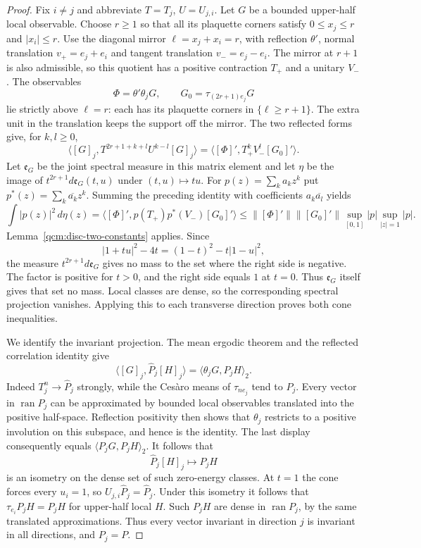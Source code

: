 \documentclass[11pt,letterpaper,reqno]{amsart}
\theoremstyle{definition}
\begin{document}
\begin{proof}
Fix $i\ne j$ and abbreviate $T=T_j$, $U=U_{j,i}$. Let $G$ be a
bounded upper-half local observable. Choose $r\ge1$ so that all its
plaquette corners satisfy $0\le x_j\le r$ and $|x_i|\le r$.
Use the diagonal mirror $\ell=x_j+x_i=r$, with reflection $\theta'$,
normal translation $v_+=e_j+e_i$ and tangent translation
$v_-=e_j-e_i$. The mirror at $r+1$ is also admissible, so this
quotient has a positive contraction $T_+$ and a unitary $V_-$.
The observables
\[
 \Phi=\theta'\theta_jG,\qquad G_0=\tau_{(2r+1)e_j}G
\]
lie strictly above $\ell=r$: each has its plaquette corners in
$\{\ell\ge r+1\}$. The extra unit in the translation keeps the
support off the mirror. The two reflected forms give, for $k,l\ge0$,
\[
 \langle[G]_j,T^{2r+1+k+l}U^{k-l}[G]_j\rangle
    =\langle[\Phi]',T_+^kV_-^l[G_0]'\rangle.
\]
Let $\mathfrak e_G$ be the joint spectral measure in this matrix
element and let $\eta$ be the image of
$t^{2r+1}d\mathfrak e_G(t,u)$ under $(t,u)\mapsto tu$.
For $p(z)=\sum_k a_kz^k$ put
$p^*(z)=\sum_k\overline{a_k}z^k$. Summing the preceding identity
with coefficients $a_k\overline{a_l}$ yields
\[
 \int|p(z)|^2\,d\eta(z)
  =\langle[\Phi]',p(T_+)p^*(V_-)[G_0]'\rangle
  \le\|[\Phi]'\|\|[G_0]'\|
       \sup_{[0,1]}|p|\sup_{|z|=1}|p|.
\]
Lemma~\ref{qcm:disc-two-constants} applies. Since
\[
 |1+tu|^2-4t=(1-t)^2-t|1-u|^2,
\]
the measure $t^{2r+1}d\mathfrak e_G$ gives no mass to the set where
the right side is negative. The factor is positive for $t>0$,
and the right side equals $1$ at $t=0$. Thus
$\mathfrak e_G$ itself gives that set no mass. Local classes are
dense, so the corresponding spectral projection vanishes. Applying
this to each transverse direction proves both cone inequalities.

We identify the invariant projection. The mean ergodic theorem and
the reflected correlation identity give
\[
 \langle[G]_j,\widehat P_j[H]_j\rangle
   =\langle\theta_jG,P_jH\rangle_2.
\]
Indeed $T_j^n\to\widehat P_j$ strongly, while the Ces\`aro means of
$\tau_{ne_j}$ tend to $P_j$. Every vector in $\operatorname{ran}P_j$
can be approximated by bounded local observables translated into
the positive half-space. Reflection positivity then shows that
$\theta_j$ restricts to a positive involution on this subspace,
and hence is the identity. The last display consequently equals
$\langle P_jG,P_jH\rangle_2$. It follows that
\[
 \widehat P_j[H]_j\longmapsto P_jH
\]
is an isometry on the dense set of such zero-energy classes.
At $t=1$ the cone forces every $u_i=1$, so
$U_{j,i}\widehat P_j=\widehat P_j$. Under this isometry it follows
that $\tau_{e_i}P_jH=P_jH$ for upper-half local $H$. Such $P_jH$
are dense in $\operatorname{ran}P_j$, by the same translated
approximations. Thus every vector invariant in direction $j$ is
invariant in all directions, and $P_j=P$.
\end{proof}
\end{document}
